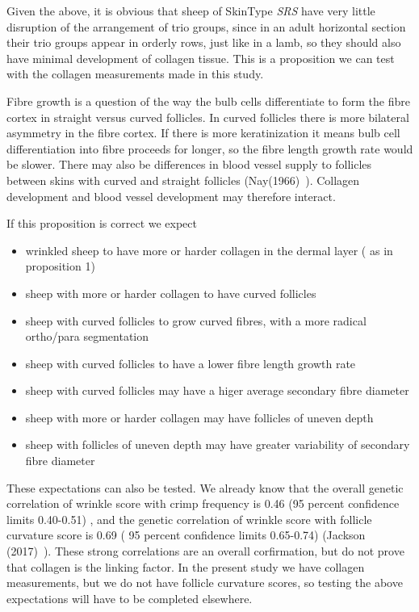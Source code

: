\documentclass[titlepage]{article}  %
\begin{document}
Given the above, it is obvious that sheep of SkinType {\em SRS} have very little disruption of the arrangement of trio groups, since in an adult horizontal section their trio groups appear in orderly rows, just like in a lamb, so they should also have minimal development of collagen tissue. This is a proposition we can test with the collagen measurements made in this study.

Fibre growth is a question of the way the bulb cells differentiate to form the fibre cortex in straight versus curved follicles. In curved follicles there is more bilateral asymmetry in the fibre cortex. If there is more keratinization it means bulb cell differentiation into fibre proceeds for longer, so the fibre length growth rate would be slower. There may also be differences in blood vessel supply to follicles between skins with curved and straight follicles (Nay(1966)~\cite{nay:66}). Collagen development and blood vessel development may therefore interact.

If this proposition is correct we expect
\begin{itemize}
\item wrinkled sheep to have more or harder collagen in the dermal layer ( as in proposition 1)
\item sheep with more or harder collagen to have curved follicles
\item sheep with curved follicles to grow curved fibres, with a more radical ortho/para segmentation
\item sheep with curved follicles to have a lower fibre length growth rate
\item sheep with curved follicles may have a higer average secondary fibre diameter
\item sheep with more or harder collagen may have follicles of uneven depth
\item sheep with follicles of uneven depth may have greater variability of secondary fibre diameter
\end{itemize}

These expectations can also be tested. We already know that the overall genetic correlation of wrinkle score with crimp frequency is 0.46 (95 percent confidence limits 0.40-0.51) , and the genetic correlation of wrinkle score with follicle curvature score is 0.69 ( 95 percent confidence limits 0.65-0.74) (Jackson (2017)~\cite{jack:17a}).  These strong correlations are an overall corfirmation, but do not prove that collagen is the linking factor.  In the present study we have collagen measurements, but we do not have follicle curvature scores, so testing the above expectations will have to be completed elsewhere.
\end{document}
